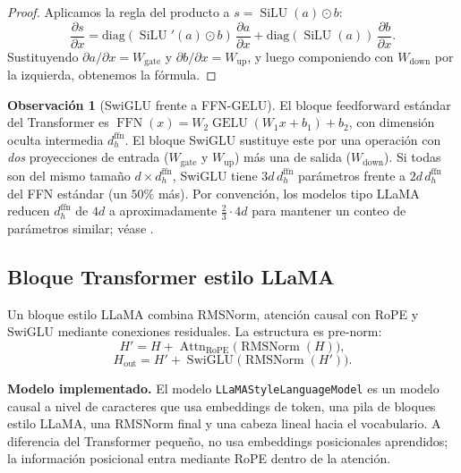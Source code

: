\documentclass[11pt]{report}
\newenvironment{tcolorbox}[1][]{\par\medskip\noindent\ignorespaces}{\par\medskip}
\theoremstyle{definition}
\newtheorem{observacion}[definicion]{Observación}
\theoremstyle{plain}
\numberwithin{equation}{section}
\newcommand{\FFN}{\operatorname{FFN}}
\newcommand{\SiLU}{\operatorname{SiLU}}
\newcommand{\GELU}{\operatorname{GELU}}
\begin{document}
\begin{proof}
Aplicamos la regla del producto a \(s=\SiLU(a)\odot b\):
\begin{equation*}
    \frac{\partial s}{\partial x}=\mathrm{diag}(\SiLU'(a)\odot b)\,\frac{\partial a}{\partial x}+\mathrm{diag}(\SiLU(a))\,\frac{\partial b}{\partial x}.
\end{equation*}
Sustituyendo \(\partial a/\partial x=W_{\mathrm{gate}}\) y \(\partial b/\partial x=W_{\mathrm{up}}\), y luego componiendo con \(W_{\mathrm{down}}\) por la izquierda, obtenemos la fórmula.
\end{proof}

\begin{observacion}[SwiGLU frente a FFN-GELU]
El bloque feedforward estándar del Transformer es \(\FFN(x)=W_2\GELU(W_1 x+b_1)+b_2\), con dimensión oculta intermedia \(d_h^{\mathrm{ffn}}\). El bloque SwiGLU sustituye este por una operación con \emph{dos} proyecciones de entrada (\(W_{\mathrm{gate}}\) y \(W_{\mathrm{up}}\)) más una de salida (\(W_{\mathrm{down}}\)). Si todas son del mismo tamaño \(d\times d_h^{\mathrm{ffn}}\), SwiGLU tiene \(3 d\,d_h^{\mathrm{ffn}}\) parámetros frente a \(2d\,d_h^{\mathrm{ffn}}\) del FFN estándar (un \(50\%\) más). Por convención, los modelos tipo LLaMA reducen \(d_h^{\mathrm{ffn}}\) de \(4d\) a aproximadamente \(\tfrac{2}{3}\cdot 4d\) para mantener un conteo de parámetros similar; véase \citet{touvron-2023-llama}.
\end{observacion}

\subsection{Bloque Transformer estilo LLaMA}

Un bloque estilo LLaMA combina RMSNorm, atención causal con RoPE y SwiGLU mediante conexiones residuales. La estructura es pre-norm:
\begin{equation*}
    H'
    =
    H
    +
    \operatorname{Attn}_{\mathrm{RoPE}}
    \bigl(
        \operatorname{RMSNorm}(H)
    \bigr),
\end{equation*}
\begin{equation*}
    H_{\mathrm{out}}
    =
    H'
    +
    \operatorname{SwiGLU}
    \bigl(
        \operatorname{RMSNorm}(H')
    \bigr).
\end{equation*}

\begin{tcolorbox}[colback=blue!8, colframe=blue!8, boxrule=0pt]
\textbf{Modelo implementado.} El modelo \texttt{LLaMAStyleLanguageModel} es un modelo causal a nivel de caracteres que usa embeddings de token, una pila de bloques estilo LLaMA, una RMSNorm final y una cabeza lineal hacia el vocabulario. A diferencia del Transformer pequeño, no usa embeddings posicionales aprendidos; la información posicional entra mediante RoPE dentro de la atención.
\end{tcolorbox}
\end{document}
